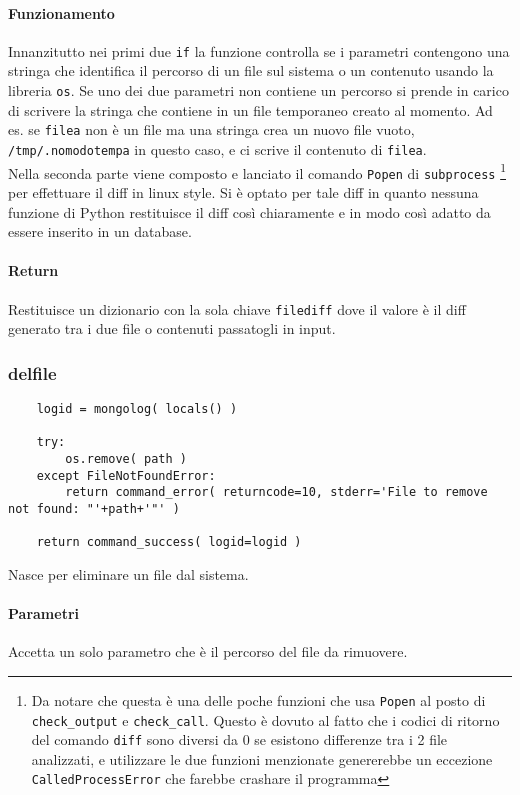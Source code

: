 \documentclass[11pt]{article}
\begin{document}
\paragraph{Funzionamento}
Innanzitutto nei primi due \texttt{if} la funzione controlla se i parametri contengono una stringa che identifica il percorso di un file sul sistema
o un contenuto usando la libreria \texttt{os}. Se uno dei due parametri non contiene un percorso si prende in carico di scrivere la stringa che contiene
in un file temporaneo creato al momento.
Ad es. se \texttt{filea} non è un file ma una stringa crea un nuovo file vuoto, \texttt{/tmp/.nomodotempa} in questo caso, e ci scrive il contenuto
di \texttt{filea}. \\
Nella seconda parte viene composto e lanciato il comando \texttt{Popen} di \texttt{subprocess}
\footnote{\label{Popenneeded} Da notare che questa è una delle poche funzioni che usa \texttt{Popen} al posto di \texttt{check\_output} e \texttt{check\_call}.
Questo è dovuto al fatto che i codici di ritorno del comando \texttt{diff} sono diversi da 0 se esistono differenze tra i 2 file analizzati, e utilizzare
le due funzioni menzionate genererebbe un eccezione \texttt{CalledProcessError} che farebbe crashare il programma}
per effettuare il diff in linux style. Si è optato per tale diff in quanto nessuna funzione di Python restituisce il diff
così chiaramente e in modo così adatto da essere inserito in un database.\\
\paragraph{Return}
Restituisce un dizionario con la sola chiave \texttt{filediff} dove il valore è il diff generato tra i due file o contenuti passatogli
in input.

\subsubsection{delfile}\label{delfile}
\begin{lstlisting}
    logid = mongolog( locals() )

    try:
        os.remove( path )
    except FileNotFoundError:
        return command_error( returncode=10, stderr='File to remove not found: "'+path+'"' )

    return command_success( logid=logid )
\end{lstlisting}
Nasce per eliminare un file dal sistema.
\paragraph{Parametri}
Accetta un solo parametro che è il percorso del file da rimuovere.
\end{document}

